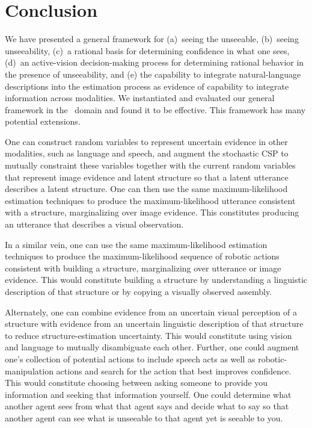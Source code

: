 \par\vspace{-1ex}
\section{Conclusion}
\label{sec:conclusion}

We have presented a general framework for (a)~seeing the unseeable, (b)~seeing
unseeability, (c)~a rational basis for determining confidence in what one sees,
(d)~an active-vision decision-making process for determining rational behavior
in the presence of unseeability, and (e) the capability to integrate
natural-language descriptions into the estimation process as evidence of
capability to integrate information across modalities.
%
We instantiated and evaluated our general framework in the
\LincolnLog\ domain and found it to be effective.
%
This framework has many potential extensions.

One can construct random variables to represent uncertain evidence in other
modalities, such as language and speech, and augment the stochastic CSP
to mutually constraint these variables together with the current random
variables that represent image evidence and latent structure so that a latent
utterance describes a latent structure.
%
One can then use the same maximum-likelihood estimation techniques to produce
the maximum-likelihood utterance consistent with a structure, marginalizing
over image evidence.
%
This constitutes producing an utterance that describes a visual observation.

In a similar vein, one can use the same maximum-likelihood estimation
techniques to produce the maximum-likelihood sequence of robotic actions
consistent with building a structure, marginalizing over utterance or image
evidence.
%
This would constitute building a structure by understanding a linguistic
description of that structure or by copying a visually observed assembly.

Alternately, one can combine evidence from an uncertain visual perception of a
structure with evidence from an uncertain linguistic description of that
structure to reduce structure-estimation uncertainty.
%
This would constitute using vision and language to mutually disambiguate each
other.
%
Further, one could augment one's collection of potential actions to include
speech acts as well as robotic-manipulation actions and search for the action
that best improves confidence.
%
This would constitute choosing between asking someone to provide you information
and seeking that information yourself.
%
One could determine what another agent sees from what that agent says and
decide what to say so that another agent can see what is unseeable to that
agent yet is seeable to you.

